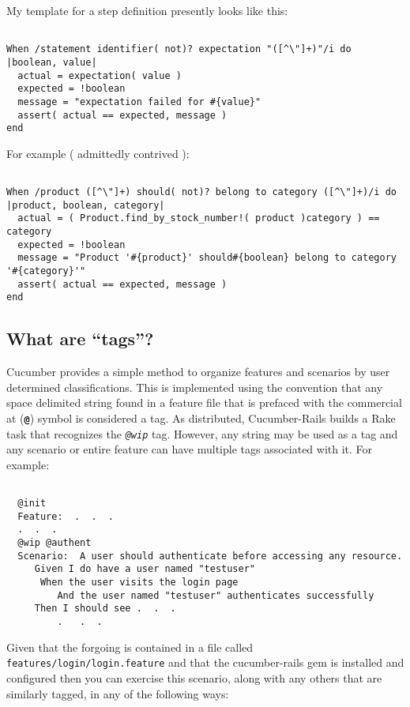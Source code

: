 My template for a step definition presently looks like this:
\begin{verbatim}

When /statement identifier( not)? expectation "([^\"]+)"/i do |boolean, value|
  actual = expectation( value )
  expected = !boolean
  message = "expectation failed for #{value}" 
  assert( actual == expected, message )
end

\end{verbatim}

For example ( admittedly contrived ):
\begin{verbatim}

When /product ([^\"]+) should( not)? belong to category ([^\"]+)/i do |product, boolean, category|
  actual = ( Product.find_by_stock_number!( product )category ) == category 
  expected = !boolean
  message = "Product '#{product}' should#{boolean} belong to category '#{category}'"
  assert( actual == expected, message )
end

\end{verbatim}

\subsection{What are ``tags''?}

Cucumber provides a simple method to organize features and scenarios by user determined classifications.  This is implemented using the convention that any space delimited string found in a feature file that is prefaced with the commercial at (\textbf{\verb+@+}) symbol is considered a tag.  As distributed, Cucumber-Rails builds a Rake task that recognizes the \emph{\verb+@wip+} tag.  However, any string may be used as a tag and any scenario or entire feature can have multiple tags associated with it.  For example:

\begin{verbatim}

  @init
  Feature:  .  .  .
  .  .  .
  @wip @authent
  Scenario:  A user should authenticate before accessing any resource.
     Given I do have a user named "testuser"
      When the user visits the login page
         And the user named "testuser" authenticates successfully
     Then I should see .  .  .
         .   .  .

\end{verbatim}

Given that the forgoing is contained in a file called \verb+features/login/login.feature+ and that the cucumber-rails gem is installed and configured then you can exercise this scenario, along with any others that are similarly tagged, in any of the following ways:


